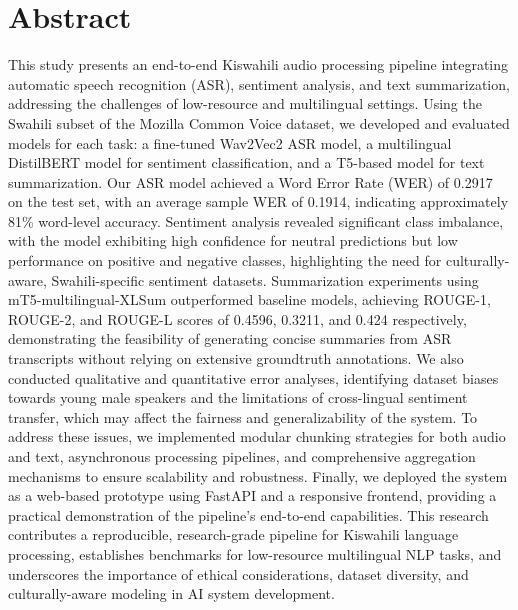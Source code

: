 \section*{Abstract}
This study presents an end-to-end Kiswahili audio processing pipeline integrating automatic speech recognition (ASR), sentiment analysis, and text summarization, addressing the challenges of low-resource and multilingual settings. Using the Swahili subset of the Mozilla Common Voice dataset, we developed and evaluated models for each task: a fine-tuned Wav2Vec2 ASR model, a multilingual DistilBERT model for sentiment classification, and a T5-based model for text summarization.
Our ASR model achieved a Word Error Rate (WER) of 0.2917 on the test set, with an average sample WER of 0.1914, indicating approximately 81\% word-level accuracy. Sentiment analysis revealed significant class imbalance, with the model exhibiting high confidence for neutral predictions but low performance on positive and negative classes, highlighting the need for culturally-aware, Swahili-specific sentiment datasets. Summarization experiments using mT5-multilingual-XLSum outperformed baseline models, achieving ROUGE-1, ROUGE-2, and ROUGE-L scores of 0.4596, 0.3211, and 0.424 respectively, demonstrating the feasibility of generating concise summaries from ASR transcripts without relying on extensive groundtruth annotations.
We also conducted qualitative and quantitative error analyses, identifying dataset biases towards young male speakers and the limitations of cross-lingual sentiment transfer, which may affect the fairness and generalizability of the system. To address these issues, we implemented modular chunking strategies for both audio and text, asynchronous processing pipelines, and comprehensive aggregation mechanisms to ensure scalability and robustness.
Finally, we deployed the system as a web-based prototype using FastAPI and a responsive frontend, providing a practical demonstration of the pipeline’s end-to-end capabilities. This research contributes a reproducible, research-grade pipeline for Kiswahili language processing, establishes benchmarks for low-resource multilingual NLP tasks, and underscores the importance of ethical considerations, dataset diversity, and culturally-aware modeling in AI system development.
